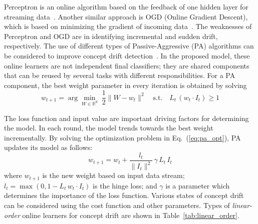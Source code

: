 \documentclass[12pt,a4paper]{article}
\begin{document}
	Perceptron is an online algorithm based on the feedback of one hidden layer for streaming data~\cite{Irie1988}. Another similar approach is OGD (Online Gradient Descent), which is based on minimizing the gradient of incoming data~\cite{Zinkevich2003}. The weaknesses of Perceptron and OGD are in identifying incremental and sudden drift, respectively. The use of different types of Passive-Aggressive (PA) algorithms can be considered to improve concept drift detection~\cite{Crammer2006}. In the proposed model, these online learners are not independent final classifiers; they are shared components that can be reused by several tasks with different responsibilities. For a PA component, the best weight parameter in every iteration is obtained by solving
	\begin{equation}
		w_{t+1} = \arg\min_{W \in \mathbb{R}^d}\; \frac{1}{2}\|W - w_t\|^2 \quad \text{s.t.}\quad L_t\,(w_t \cdot I_t) \geq 1
		\label{eq:pa_opt}
	\end{equation}
	
	The loss function and input value are important driving factors for determining the model. In each round, the model trends towards the best weight incrementally. By solving the optimization problem in Eq.~(\ref{eq:pa_opt}), PA updates its model as follows:
	\begin{equation}
		w_{t+1} = w_t + \frac{l_t}{\|I_t\|^2}\,\gamma\, L_t\, I_t
		\label{eq:pa_update}
	\end{equation}
	where $w_{t+1}$ is the new weight based on input data stream; $l_t = \max(0, 1 - L_t\,w_t \cdot I_t)$ is the hinge loss; and $\gamma$ is a parameter which determines the importance of the loss function. Various states of concept drift can be considered using the cost function and other parameters. Types of \textit{linear-order} online learners for concept drift are shown in Table~\ref{tab:linear_order}.
	
\end{document}
